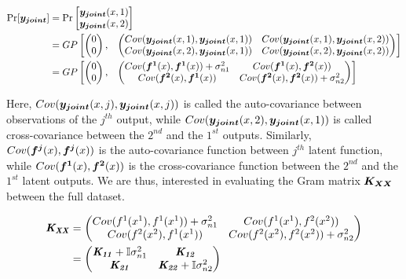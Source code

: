 \begin{equation}
\begin{aligned}
       \Pr[\boldsymbol{y_{joint}}] & = \Pr\begin{bmatrix}   \boldsymbol{y_{joint}}(x, 1) \\ \boldsymbol{y_{joint}}(x, 2)   \end{bmatrix} \\
& = GP\begin{bmatrix}
   \begin{pmatrix}
   0\\ 
   0
   \end{pmatrix} ,& 
   \begin{pmatrix}
    Cov(\boldsymbol{y_{joint}}(x, 1), \boldsymbol{y_{joint}}(x, 1))  & Cov(\boldsymbol{y_{joint}}(x, 1), \boldsymbol{y_{joint}}(x, 2))\\ 
    Cov(\boldsymbol{y_{joint}}(x, 2), \boldsymbol{y_{joint}}(x, 1))     & Cov(\boldsymbol{y_{joint}}(x, 2), \boldsymbol{y_{joint}}(x, 2))
   \end{pmatrix}
   \end{bmatrix} \\
& = GP\begin{bmatrix}
   \begin{pmatrix}
   0\\ 
   0
   \end{pmatrix} ,& 
   \begin{pmatrix}
    Cov(\boldsymbol{f^1}(x), \boldsymbol{f^1}(x)) + \sigma_{n1}^2 & Cov(\boldsymbol{f^1}(x), \boldsymbol{f^2}(x))\\ 
    Cov(\boldsymbol{f^2}(x), \boldsymbol{f^1}(x))     & Cov(\boldsymbol{f^2}(x), \boldsymbol{f^2}(x)) + \sigma_{n2}^2
   \end{pmatrix}
   \end{bmatrix}
\end{aligned}
   \end{equation}

Here, $Cov(\boldsymbol{y_{joint}}(x, j), \boldsymbol{y_{joint}}(x, j))$ is called the  auto-covariance between observations of the $j^{th}$ output, while $Cov(\boldsymbol{y_{joint}}(x, 2), \boldsymbol{y_{joint}}(x, 1))$ is called cross-covariance between the $2^{nd}$ and the $1^{st}$ outputs. Similarly, $Cov(\boldsymbol{f^j}(x), \boldsymbol{f^j}(x))$ is the auto-covariance function between $j^{th}$ latent function, while $Cov(\boldsymbol{f^1}(x), \boldsymbol{f^2}(x))$ is the cross-covariance function between the $2^{nd}$ and the $1^{st}$ latent outputs. We are thus, interested in evaluating the Gram matrix $\boldsymbol{K_{XX}}$ between the full dataset. 

\begin{align}
      \bm{\mathit{K_{XX}}} & =  \begin{pmatrix}
    Cov(f^1(x^{1}), f^1(x^{1})) + \sigma_{n1}^2  & Cov(f^1(x^{1}), f^2(x^{2}))\\ 
    Cov(f^2(x^{2}), f^1(x^{1}))     & Cov(f^2(x^{2}), f^2(x^{2})) + \sigma_{n2}^2
   \end{pmatrix} \\
   & = \begin{pmatrix}
    \bm{\mathit{K_{11}}} + \mathbb{I}\sigma_{n1}^2 & \bm{\mathit{K_{12}}}\\ 
    \bm{\mathit{K_{21}}}    & \bm{\mathit{K_{22}}} + \mathbb{I}\sigma_{n2}^2
   \end{pmatrix}
\end{align}


